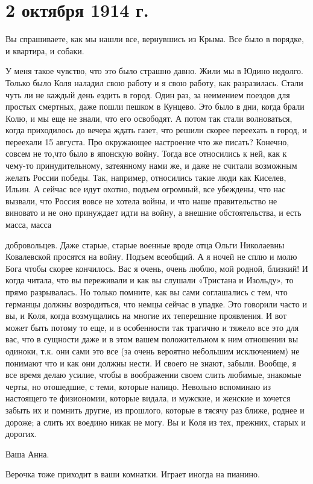 \section{2 октября 1914 г.}


Вы спрашиваете, как мы нашли все, вернувшись из Крыма. Все было в порядке, и
квартира, и собаки.


\noindent
У меня такое чувство, что это было страшно давно. Жили мы в Юдино недолго.
Только было Коля наладил свою работу и я свою работу, как
разразилась\textellipsis {}. Стали чуть ли не каждый день ездить в
город. Один раз, за неимением поездов для простых смертных, даже пошли пешком в
Кунцево. Это было в дни, когда брали Колю, и мы еще не знали, что его
освободят. А потом так стали волноваться, когда приходилось до вечера ждать
газет, что решили скорее переехать в город, и переехали 15 августа. Про
окружающее настроение что же писать? Конечно, совсем не то,что было в японскую
войну. Тогда все относились к ней, как к чему-то принудительному, затеянному
нами же, и даже не считали возможным желать России победы. Так, например,
относились такие люди как Киселев, Ильин. А сейчас все идут охотно, подъем
огромный, все убеждены, что нас вызвали, что Россия вовсе не хотела войны, и
что наше правительство не виновато и не оно принуждает идти на войну, а внешние
обстоятельства, и есть масса, масса


\noindent
добровольцев. Даже старые, старые военные вроде отца Ольги Николаевны
Ковалевской просятся на войну. Подъем всеобщий. А я ночей не сплю и молю Бога
чтобы скорее кончилось. Вас я очень, очень люблю, мой родной, близкий! И когда
читала, что вы переживали и как вы слушали «Тристана и Изольду», то прямо
разрывалась. Но только помните, как вы сами соглашались с тем, что германцы
должны возродиться, что немцы сейчас в упадке. Это говорили часто и вы, и Коля,
когда возмущались на многие их теперешние проявления. И вот может быть потому
то еще, и в особенности так трагично и тяжело все это для вас, что в сущности
даже и в этом вашем положительном к ним отношении вы одиноки, т.к. они сами это
все (за очень вероятно небольшим исключением) не понимают что и как они должны
нести. И  своего не знают, забыли. Вообще, я все время делаю
усилие, чтобы в воображении своем слить любимые, знакомые черты, но отошедшие,
с теми, которые налицо. Невольно вспоминаю из настоящего те физиономии, которые
видала, и мужские, и женские и хочется забыть их и помнить другие, из прошлого,
которые в тясячу раз ближе, роднее и дороже; а слить их воедино никак не могу.
Вы и Коля из тех, прежних, старых и дорогих.

Ваша Анна.

Верочка тоже приходит в ваши комнатки. Играет иногда на пианино.
